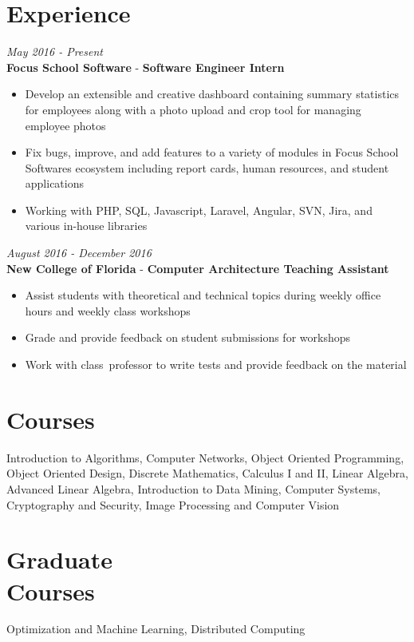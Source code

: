 \documentclass[margin,line,a4paper]{resume}
\begin{document}
\begin{resume}
    \section{\mysidestyle Experience}
        \textit{May 2016 - Present}\\
        \textbf{Focus School Software} - \textbf{Software Engineer Intern}
        \begin{itemize}
            \item Develop an extensible and creative dashboard containing summary statistics for employees along with a photo upload and crop tool for managing employee photos
            \item Fix bugs, improve, and add features to a variety of modules in Focus School Software\textquotesingle s ecosystem including report cards, human resources, and student applications
            \item Working with PHP, SQL, Javascript, Laravel, Angular, SVN, Jira, and various in-house libraries
        \end{itemize}
            
        \textit{August 2016 - December 2016}\\
        \textbf{New College of Florida} - \textbf{Computer Architecture Teaching Assistant}
        \begin{itemize}
            \item Assist students with theoretical and technical topics during weekly office hours and weekly class workshops
            \item Grade and provide feedback on student submissions for workshops
            \item Work with class\textquotesingle \, professor to write tests and provide feedback on the material
        \end{itemize}
        
    \section{\mysidestyle Courses}
        Introduction to Algorithms, Computer Networks, Object Oriented Programming, Object Oriented Design, Discrete Mathematics, Calculus I and II, Linear Algebra, Advanced Linear Algebra, Introduction to Data Mining, Computer Systems, Cryptography and Security, Image Processing and Computer Vision
        
    \section{\mysidestyle Graduate\\Courses}
        Optimization and Machine Learning, Distributed Computing
        
\end{resume}
\end{document}
